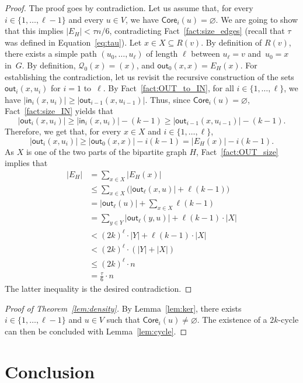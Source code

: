 \documentclass{article}
\newcommand{\F}{{\mathsf{out}}}
\renewcommand{\H}{{\mathsf{in}}}
\newcommand{\bp}{X}
\newcommand{\tp}{Y}
\begin{document}
\begin{proof}
    The proof goes by contradiction. Let us assume that, for every $i\in\{1,\dots,\ell-1\}$ and every $u \in V$, we have $\mathsf{Core}_i(u) = \varnothing$. We are going to show that this implies $|E_H|< \tau n/6$, contradicting Fact~\ref{fact:size_edges} (recall that $\tau$ was defined in Equation~\ref{eq:tau}).
    Let $x\in \bp\subseteq R(v)$. By definition of $R(v)$, there exists a simple path $(u_0,\dots,u_\ell)$ of length $\ell$ between $u_\ell=v$ and~$u_0=x$ in~$G$. By definition, $\mathcal{Q}_0(x)=(x)$, and $\F_0(x,x)=E_H(x)$. For establishing the contradiction, let us revisit the recursive construction of the sets $\F_i(x,u_i)$ for $i=1$ to~$\ell$. 
    By Fact~\ref{fact:OUT_to_IN}, for all $i\in\{1,\dots,\ell\}$, we have $|\H_i(x,u_i)| \geq |\F_{i-1}(x,u_{i-1})|$. Thus, since 
     $\mathsf{Core}_i(u)=\varnothing$, Fact~\ref{fact:size_IN} yields that
    \[|\F_i(x,u_i)|\geq |\H_i(x,u_i)|-(k-1)\geq |\F_{i-1}(x,u_{i-1})|-(k-1).\]
    Therefore, we get that, for every $x\in \bp$ and $i\in \{1,\dots,\ell\}$, 
    \[|\F_i(x,u_i)| \geq |\F_0(x,x)|-i(k-1) = |E_H(x)|-i(k-1).\] 
    As $\bp$ is one of the two parts of the bipartite graph $H$, Fact~\ref{fact:OUT_size} implies  that
    \begin{align*}
        |E_H|
        &=\sum_{x\in \bp}|E_H(x)|\\
        &\leq \sum_{x\in \bp}\Big(|\F_\ell(x,u)|+\ell(k-1)\Big)\\
        &= |\F_\ell(u)|+\sum_{x\in \bp}\ell(k-1)\\
        &=\sum_{y\in \tp}|\F_\ell(y,u)|+\ell(k-1)\cdot |\bp|\\
        &< (2k)^\ell\cdot|\tp|+\ell(k-1)\cdot|\bp|\\
        &<(2k)^\ell\cdot(|\tp|+|\bp|)\\
        &\leq (2k)^\ell\cdot n\\
        &= \frac{\tau}{6}\cdot n
    \end{align*}
The latter inequality is the desired contradiction.  
\end{proof}

\begin{proof}[Proof of Theorem~\ref{lem:density}]
    By Lemma~\ref{lem:ker}, there exists $i\in\{1,\dots,\ell-1\}$ and $u\in V$ such that $\mathsf{Core}_i(u)\neq\varnothing$. The existence of a $2k$-cycle can then be concluded with Lemma~\ref{lem:cycle}.
\end{proof}

\section{Conclusion}\label{sec:conclu}
\end{document}
